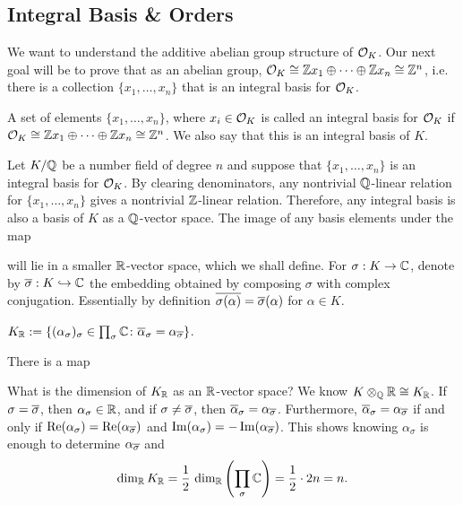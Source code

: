 \subsection{Integral Basis \& Orders}

We want to understand the additive abelian group structure of $\mathcal{O}_K$. Our next goal will be to prove that as an abelian group, $\mathcal{O}_K \cong \mathbb{Z} x_1 \oplus \cdots \oplus \mathbb{Z} x_n \cong \mathbb{Z}^n$, i.e. there is a collection $\{ x_1, \ldots, x_n \}$ that is an integral basis for $\mathcal{O}_K$. 


\begin{dfn}
A set of elements $\{x_1,\ldots,x_n\}$, where $x_i \in \mathcal{O}_K$ is called an integral basis for $\mathcal{O}_K$ if $\mathcal{O}_K \cong \mathbb{Z} x_1 \oplus \cdots \oplus \mathbb{Z} x_n \cong \mathbb{Z}^n$. We also say that this is an integral basis of $K$.
\end{dfn}


Let $K/\mathbb{Q}$ be a number field of degree $n$ and suppose that $\{ x_1, \ldots, x_n \}$ is an integral basis for $\mathcal{O}_K$. By clearing denominators, any nontrivial $\mathbb{Q}$-linear relation for $\{ x_1, \ldots, x_n \}$ gives a nontrivial $\mathbb{Z}$-linear relation. Therefore, any integral basis is also a basis of $K$ as a $\mathbb{Q}$-vector space. The image of any basis elements under the map
	\begin{center}
	\end{center}
will lie in a smaller $\mathbb{R}$-vector space, which we shall define. For $\sigma: K \to \mathbb{C}$, denote by $\overline{\sigma}: K \hookrightarrow \mathbb{C}$ the embedding obtained by composing $\sigma$ with complex conjugation. Essentially by definition $\overline{\sigma(\alpha)}= \overline{\sigma}(\alpha)$ for $\alpha \in K$. 


\begin{dfn}
$K_{\mathbb{R}}:= \{ (\alpha_\sigma)_\sigma \in \prod_\sigma \mathbb{C} \colon \overline{\alpha}_\sigma = \alpha_{\overline{\sigma}} \}$.
\end{dfn}


There is a map
	\begin{center}
	\end{center}
What is the dimension of $K_{\mathbb{R}}$ as an $\mathbb{R}$-vector space? We know $K \otimes_{\mathbb{Q}} \mathbb{R} \cong K_{\mathbb{R}}$. If $\sigma= \overline{\sigma}$, then $\alpha_\sigma \in \mathbb{R}$, and if $\sigma \neq \overline{\sigma}$, then $\overline{\alpha}_\sigma= \alpha_{\overline{\sigma}}$. Furthermore, $\overline{\alpha}_\sigma= \alpha_{\overline{\sigma}}$ if and only if $\operatorname{Re}(\alpha_\sigma)= \operatorname{Re}(\alpha_{\overline{\sigma}})$ and $\operatorname{Im}(\alpha_\sigma)= -\operatorname{Im}(\alpha_{\overline{\sigma}})$. This shows knowing $\alpha_\sigma$ is enough to determine $\alpha_{\overline{\sigma}}$ and
	\[
	\dim_{\mathbb{R}} K_{\mathbb{R}} = \frac{1}{2} \, \dim_{\mathbb{R}}\left(\prod_\sigma \mathbb{C} \right) = \frac{1}{2} \cdot 2n= n.
	\]


